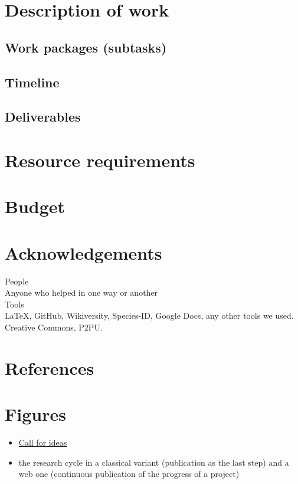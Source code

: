 \documentclass[final,authoryear,3p]{elsarticle-open-drafting}
\begin{document}
\section{Description of work}
\subsection{Work packages (subtasks)}
\subsection{Timeline}
\subsection{Deliverables}

\section{Resource requirements}
\section{Budget}
\section{Acknowledgements}
People\\
Anyone who helped in one way or another\\

Tools\\
\LaTeX, GitHub, Wikiversity, Species-ID, Google Docs, any other tools we used.
Creative Commons, P2PU.

\section{References}

 


\section{Figures}
\begin{itemize}
	\item \href{http://friendfeed.com/danielmietchen/4174de55/looking-for-ideas-how-to-illustrate-our}{Call for ideas}
	\item the research cycle in a classical variant (publication as the last step) and a web one (continuous publication of the progress of a project)
\end{itemize}
\end{document}
